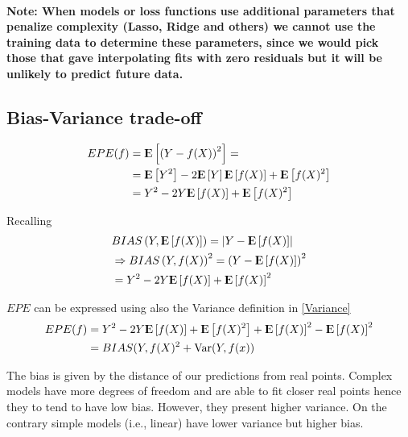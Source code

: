 \documentclass[12pt, letterpaper]{article}
\theoremstyle{definition}
\newcommand{\E}{{\rm I\kern-.3em E}}
\newcommand{\Var}{\mathrm{Var}}
\begin{document}
\paragraph{\textbf{Note}: When models or loss functions use additional parameters that penalize complexity (Lasso, Ridge and others) we cannot use the training data to determine these parameters, since we would pick those that gave interpolating fits with zero residuals but it will be unlikely to predict future data.}

\subsection{Bias-Variance trade-off}
\begin{equation}
\begin{aligned}
EPE(f) &= \E \left[ \left( Y- f(X) \right)^2 \right] =\\
            &= \E \left[ Y^2\right] - 2 \E \left[ Y\right] \E\left[ f(X)\right] + \E\left[ f(X)^2\right]\\
             &= Y^2 - 2  Y \E\left[ f(X)\right] + \E\left[ f(X)^2\right]
\end{aligned}
\end{equation}

Recalling 
\begin{equation}
\begin{aligned}
&BIAS\left(Y,\E\left[f(X)\right]\right) = \left| Y-\E\left[f(X)\right]\right| \\
&\Rightarrow BIAS\left(Y,f(X)\right)^2 = \left( Y-\E\left[f(X)\right]\right)^2 \\
&= Y^2 -2 Y \E\left[f(X)\right] + \E\left[f(X)\right]^2 \\
\end{aligned}
\end{equation}

$EPE$ can be expressed using also the Variance definition in \autoref{Variance}
\begin{equation}
\begin{aligned}
\label{biasVar}
EPE(f) &=  Y^2 - 2  Y \E\left[ f(X)\right] + \E\left[ f(X)^2\right] +\E\left[f(X)\right]^2-\E\left[f(X)\right]^2\\
&= BIAS(Y, f(X)^2 + \Var(Y, f(x))
\end{aligned}
\end{equation}

The bias is given by the distance of our predictions from real points. Complex models have more degrees of freedom and are able to fit closer real points hence they to tend to have low bias. However, they present higher variance. On the contrary simple models (i.e., linear) have lower variance but higher bias.
\end{document}
